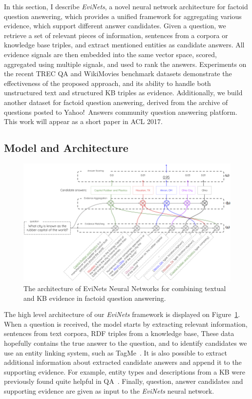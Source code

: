 In this section, I describe \textit{EviNets}, a novel neural network architecture for factoid question answering, which provides a unified framework for aggregating various evidence, which support different answer candidates.
Given a question, we retrieve a set of relevant pieces of information, \eg sentences from a corpora or knowledge base triples, and extract mentioned entities as candidate answers.
All evidence signals are then embedded into the same vector space, scored, aggregated using multiple signals, and used to rank the answers.
Experiments on the recent TREC QA and WikiMovies benchmark datasets demonstrate the effectiveness of the proposed approach, and its ability to handle both unstructured text and structured KB triples as evidence.
Additionally, we build another dataset for factoid question answering, derived from the archive of questions posted to Yahoo!~Answers community question answering platform.
This work will appear as a short paper in ACL 2017.

\subsection{Model and Architecture}
\label{section:factoid:evinets:model}

\begin{figure}[t]
\centering
\includegraphics[width=\textwidth]{img/EviNet}
\caption{The architecture of EviNets Neural Networks for combining textual and KB evidence in factoid question answering.}
\label{figure:factoid:evinet:model}
\end{figure}

The high level architecture of our \textit{EviNets} framework is displayed on Figure~\ref{figure:factoid:evinet:model}.
When a question is received, the model starts by extracting relevant information, \eg sentences from text corpora, RDF triples from a knowledge base, \etc
These data hopefully contains the true answer to the question, and to identify candidates we use an entity linking system, such as TagMe~\cite{ferragina2010tagme}.
It is also possible to extract additional information about extracted candidate answers and append it to the supporting evidence.
For example, entity types and descriptions from a KB were previously found quite helpful in QA~\cite{Sun:2015:ODQ:2736277.2741651}.
Finally, question, answer candidates and supporting evidence are given as input to the \textit{EviNets} neural network.

